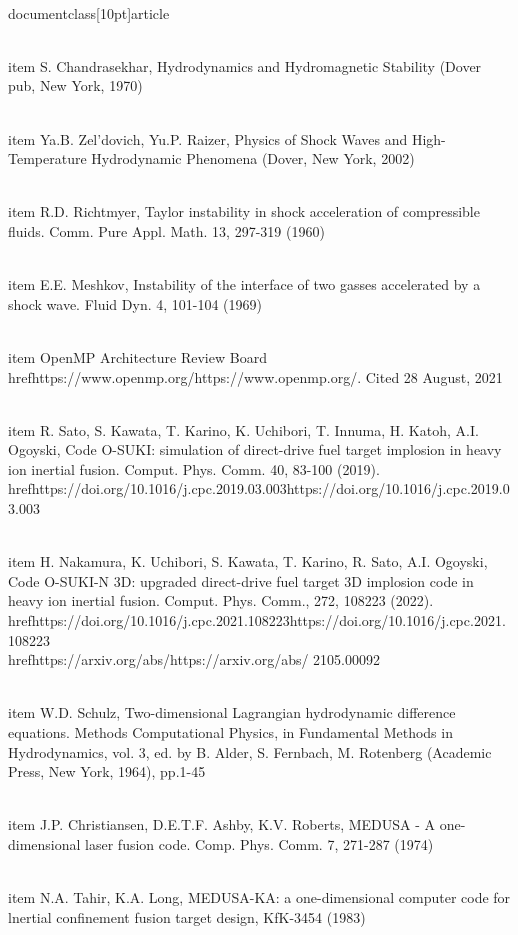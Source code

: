 \\documentclass[10pt]{article}
\begin{document}
{{{{  \\item S. Chandrasekhar, Hydrodynamics and Hydromagnetic Stability (Dover pub, New York, 1970)

  \\item Ya.B. Zel'dovich, Yu.P. Raizer, Physics of Shock Waves and High-Temperature Hydrodynamic Phenomena (Dover, New York, 2002)

  \\item R.D. Richtmyer, Taylor instability in shock acceleration of compressible fluids. Comm. Pure Appl. Math. 13, 297-319 (1960)

  \\item E.E. Meshkov, Instability of the interface of two gasses accelerated by a shock wave. Fluid Dyn. 4, 101-104 (1969)

  \\item OpenMP Architecture Review Board \\href{https://www.openmp.org/}{https://www.openmp.org/}. Cited 28 August, 2021

  \\item R. Sato, S. Kawata, T. Karino, K. Uchibori, T. Innuma, H. Katoh, A.I. Ogoyski, Code O-SUKI: simulation of direct-drive fuel target implosion in heavy ion inertial fusion. Comput. Phys. Comm. 40, 83-100 (2019). \\href{https://doi.org/10.1016/j.cpc.2019.03.003}{https://doi.org/10.1016/j.cpc.2019.03.003}

  \\item H. Nakamura, K. Uchibori, S. Kawata, T. Karino, R. Sato, A.I. Ogoyski, Code O-SUKI-N 3D: upgraded direct-drive fuel target 3D implosion code in heavy ion inertial fusion. Comput. Phys. Comm., 272, 108223 (2022). \\href{https://doi.org/10.1016/j.cpc.2021.108223}{https://doi.org/10.1016/j.cpc.2021.108223} \\href{https://arxiv.org/abs/}{https://arxiv.org/abs/} 2105.00092

  \\item W.D. Schulz, Two-dimensional Lagrangian hydrodynamic difference equations. Methods Computational Physics, in Fundamental Methods in Hydrodynamics, vol. 3, ed. by B. Alder, S. Fernbach, M. Rotenberg (Academic Press, New York, 1964), pp.1-45

  \\item J.P. Christiansen, D.E.T.F. Ashby, K.V. Roberts, MEDUSA - A one-dimensional laser fusion code. Comp. Phys. Comm. 7, 271-287 (1974)

  \\item N.A. Tahir, K.A. Long, MEDUSA-KA: a one-dimensional computer code for lnertial confinement fusion target design, KfK-3454 (1983)

}}}}
\end{document}
